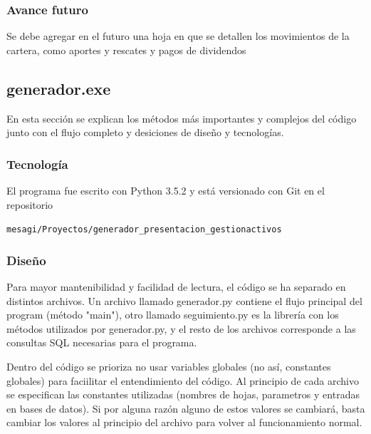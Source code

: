 \documentclass{article}
\begin{document}
\begin{itemize}
\end{itemize}
\subsubsection{Avance futuro}
Se debe agregar en el futuro una hoja en que se detallen los movimientos de la cartera, como aportes y rescates y pagos de dividendos

\subsection{generador.exe}
En esta sección se explican los métodos más importantes y complejos del código junto con el flujo completo y desiciones de diseño y tecnologías. 
\subsubsection{Tecnología}
El programa fue escrito con Python 3.5.2 y está versionado con Git en el repositorio 
\begin{center}
\texttt{mesagi/Proyectos/generador\_presentacion\_gestionactivos}
\end{center}
\subsubsection{Diseño}
Para mayor mantenibilidad y facilidad de lectura, el código se ha separado en distintos archivos. Un archivo llamado generador.py contiene el flujo principal del program (método "main"), otro llamado seguimiento.py es la librería con los métodos utilizados por generador.py, y el resto de los archivos corresponde a las consultas SQL necesarias para el programa.

Dentro del código se prioriza no usar variables globales (no así, constantes globales) para faciilitar el entendimiento del código. Al principio de cada archivo se especifican las constantes utilizadas (nombres de hojas, parametros y entradas en bases de datos). Si por alguna razón alguno de estos valores se cambiará, basta cambiar los valores al principio del archivo para volver al funcionamiento normal. 
\end{document}
